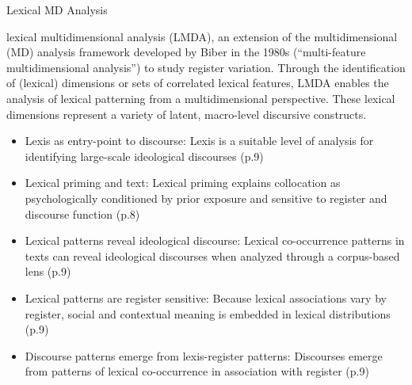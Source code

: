 \begin{frame}{Lexical MD Analysis}
\scriptsize
\vspace*{-4em}
\begin{exampleblock}{\cite[p.1]{lmdabook}}
lexical multidimensional analysis (LMDA), an extension of the multidimensional (MD) analysis framework developed by Biber in the 1980s (``multi-feature multidimensional analysis”) to study register variation. Through the identification of (lexical) dimensions or sets of correlated lexical features, LMDA enables the analysis of lexical patterning from a multidimensional perspective. These lexical dimensions represent a variety of latent, macro-level discursive constructs.
\end{exampleblock}

\begin{itemize}
\item Lexis as entry-point to discourse: Lexis is a suitable level of analysis for identifying large-scale ideological discourses (p.9)
\item Lexical priming and text: Lexical priming \citep{hoey2005priming} explains collocation as psychologically conditioned by prior exposure and sensitive to register and discourse function (p.8)
\item Lexical patterns reveal ideological discourse: Lexical co-occurrence patterns in texts can reveal ideological discourses when analyzed through a corpus-based lens (p.9)
\item Lexical patterns are register sensitive: Because lexical associations vary by register, social and contextual meaning is embedded in lexical distributions (p.9)
\item Discourse patterns emerge from lexis-register patterns: Discourses emerge from patterns of lexical co-occurrence in association with register (p.9)
\end{itemize}
\end{frame}






